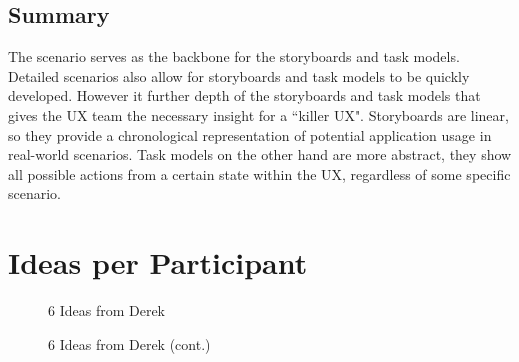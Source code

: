 \documentclass[5pt]{article} %
\begin{document}
\subsection{Summary}
The scenario serves as the backbone for the storyboards and task models. Detailed scenarios also allow for storyboards and task models to be quickly developed. However it further depth of the storyboards and task models that gives the UX team the necessary insight for a ``killer UX". Storyboards are linear, so they provide a chronological representation of potential application usage in real-world scenarios. Task models on the other hand are more abstract, they show all possible actions from a certain state within the UX, regardless of some specific scenario. 

\newpage
\section{Ideas per Participant}

\begin{figure}[h!]
\centering
{}
\caption{6 Ideas from Derek}
\end{figure}

\begin{figure}[h!]
\centering
{}
\caption{6 Ideas from Derek (cont.)}
\end{figure}
\end{document}
